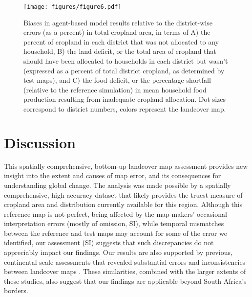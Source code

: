 \documentclass{pnastwo2}
\begin{document}
\begin{article}

\begin{figure}[!ht]
\centerline{\texttt{[image: figures/figure6.pdf]}}
\caption{Biases in agent-based model results relative to the district-wise errors (as a percent) in total cropland area, in terms of A) the percent of cropland in each district that was not allocated to any household, B) the land deficit, or the total area of cropland that should have been allocated to households in each district but wasn't (expressed as a percent of total district cropland, as determined by test maps), and C) the food deficit, or the percentage shortfall (relative to the reference simulation) in mean household food production resulting from inadequate cropland allocation. Dot sizes correspond to district numbers, colors represent the landcover map.}
\label{afoto}
\end{figure}

\section{Discussion}
This spatially comprehensive, bottom-up landcover map assessment provides new insight into the extent and causes of map error, and its consequences for understanding global change. The analysis was made possible by a spatially comprehensive, high accuracy dataset that likely provides the truest measure of cropland area and distribution currently available for this region. Although this reference map is not perfect, being affected by the map-makers' occasional interpretation errors (mostly of omission, SI), while temporal mismatches between the reference and test maps may account for some of the error we identified, our assessment (SI) suggests that such discrepancies do not appreciably impact our findings. Our results are also supported by previous, continental-scale assessments that revealed substantial errors and inconsistencies between landcover maps \cite{fritz_comparison_2010,gross_monitoring_2013}. These similarities, combined with the larger extents of these studies, also suggest that our findings are applicable beyond South Africa's borders.


\end{article}
\end{document}
